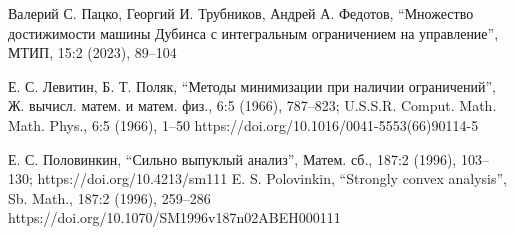 \documentclass[../main.tex]{subfiles}
\begin{document}
\begin{thebibliography}{99}
 Валерий С. Пацко, Георгий И. Трубников, Андрей А. Федотов, “Множество достижимости машины Дубинса с интегральным ограничением на управление”, МТИП, 15:2 (2023), 89–104

Е. С. Левитин, Б. Т. Поляк, “Методы минимизации при наличии ограничений”, Ж. вычисл. матем. и матем. физ., 6:5 (1966), 787–823; U.S.S.R. Comput. Math. Math. Phys., 6:5 (1966), 1–50 https://doi.org/10.1016/0041-5553(66)90114-5

Е. С. Половинкин, “Сильно выпуклый анализ”, Матем. сб., 187:2 (1996), 103–130;  https://doi.org/10.4213/sm111 
E. S. Polovinkin, “Strongly convex analysis”, Sb. Math., 187:2 (1996), 259–286 https://doi.org/10.1070/SM1996v187n02ABEH000111












\end{thebibliography}
\end{document}
